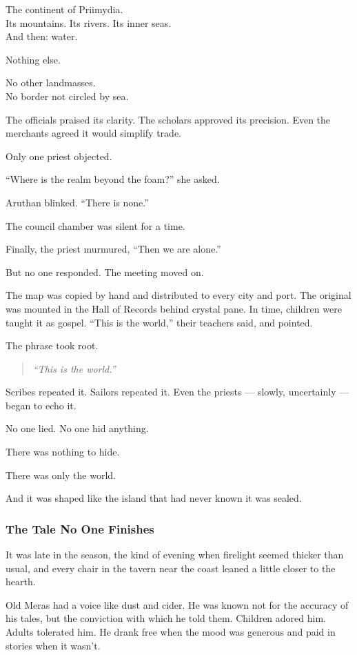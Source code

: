 \documentclass[12pt]{article}
\begin{document}
The continent of Priimydia.\\
Its mountains. Its rivers. Its inner seas.\\
And then: water.

Nothing else.

No other landmasses.\\
No border not circled by sea.

The officials praised its clarity. The scholars approved its precision. Even the merchants agreed it would simplify trade.

Only one priest objected.

``Where is the realm beyond the foam?'' she asked.

Aruthan blinked. ``There is none.''

The council chamber was silent for a time.

Finally, the priest murmured, ``Then we are alone.''

But no one responded. The meeting moved on.

The map was copied by hand and distributed to every city and port. The original was mounted in the Hall of Records behind crystal pane. In time, children were taught it as gospel. ``This is the world,'' their teachers said, and pointed.

The phrase took root.

\begin{quote}
\emph{``This is the world.''}
\end{quote}

Scribes repeated it. Sailors repeated it. Even the priests — slowly, uncertainly — began to echo it.

No one lied. No one hid anything.

There was nothing to hide.

There was only the world.

And it was shaped like the island that had never known it was sealed.


\dotfill

\subsubsection*{The Tale No One Finishes}

It was late in the season, the kind of evening when firelight seemed thicker than usual, and every chair in the tavern near the coast leaned a little closer to the hearth.

Old Meras had a voice like dust and cider. He was known not for the accuracy of his tales, but the conviction with which he told them. Children adored him. Adults tolerated him. He drank free when the mood was generous and paid in stories when it wasn’t.
\end{document}
